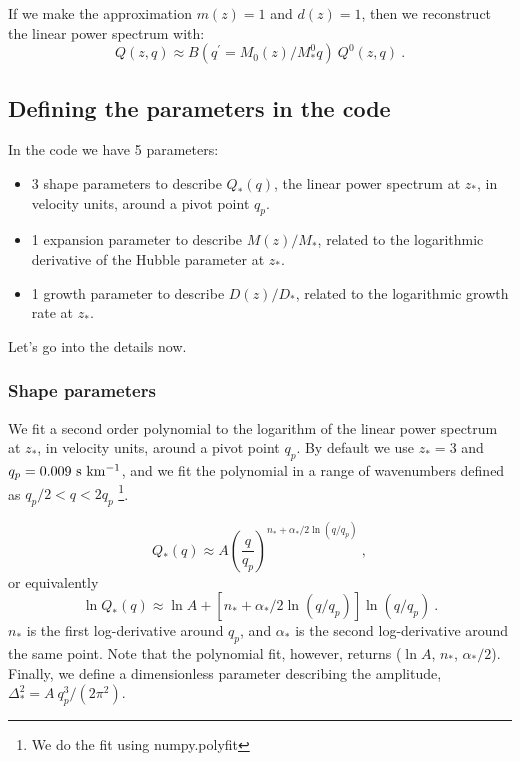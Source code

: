 If we make the approximation $m(z)=1$ and $d(z)=1$, then we reconstruct
the linear power spectrum with:
\begin{equation}
 Q(z,q) \approx B(q^\prime= M_0(z)/M^0_\ast q) ~ Q^0(z,q) ~.
\end{equation}


\subsection{Defining the parameters in the code}

In the code we have 5 parameters:
\begin{itemize}
 \item 3 shape parameters to describe $Q_\ast(q)$, the linear power spectrum
  at $z_\ast$, in velocity units, around a pivot point $q_p$.
 \item 1 expansion parameter to describe $M(z)/M_\ast$, related to the
  logarithmic derivative of the Hubble parameter at $z_\ast$.
 \item 1 growth parameter to describe $D(z)/D_\ast$, related to the
  logarithmic growth rate at $z_\ast$.
\end{itemize}

Let's go into the details now.


\subsubsection{Shape parameters} 

We fit a second order polynomial to the logarithm of the linear power
spectrum at $z_\ast$, in velocity units, around a pivot point $q_p$.
By default we use $z_\ast=3$ and $q_p=0.009~{\rm s~km^{-1}}$, and we fit the polynomial
in a range of wavenumbers defined as $q_p / 2 < q < 2 q_p$
\footnote{We do the fit using numpy.polyfit}.

\begin{equation}
 Q_\ast(q) \approx A \left( \frac{q}{q_p} \right)^{n_\ast + \alpha_\ast /2 \ln (q/q_p)} ~,
\end{equation}
or equivalently
\begin{equation}
 \ln Q_\ast(q) \approx \ln A + \left[ n_\ast + \alpha_\ast /2 \ln (q/q_p) \right] \ln (q/q_p)~.
\end{equation}
$n_\ast$ is the first log-derivative around $q_p$, and $\alpha_\ast$
is the second log-derivative around the same point.
Note that the polynomial fit, however, returns
($\ln A$, $n_\ast$, $\alpha_\ast /2$).
Finally, we define a dimensionless parameter describing the amplitude, 
$\Delta^2_\ast = A ~ q_p^3 / (2\pi^2)$.

